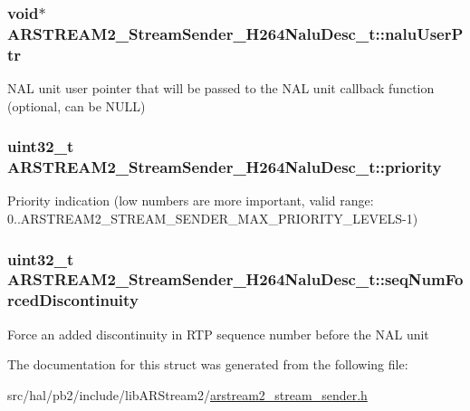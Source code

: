\subsubsection[{\texorpdfstring{nalu\+User\+Ptr}{naluUserPtr}}]{\setlength{\rightskip}{0pt plus 5cm}void$\ast$ A\+R\+S\+T\+R\+E\+A\+M2\+\_\+\+Stream\+Sender\+\_\+\+H264\+Nalu\+Desc\+\_\+t\+::nalu\+User\+Ptr}\hypertarget{struct_a_r_s_t_r_e_a_m2___stream_sender___h264_nalu_desc__t_add69d20cc84476ff31baeabfe43c672d}{}\label{struct_a_r_s_t_r_e_a_m2___stream_sender___h264_nalu_desc__t_add69d20cc84476ff31baeabfe43c672d}
N\+AL unit user pointer that will be passed to the N\+AL unit callback function (optional, can be N\+U\+LL) 
\subsubsection[{\texorpdfstring{priority}{priority}}]{\setlength{\rightskip}{0pt plus 5cm}uint32\+\_\+t A\+R\+S\+T\+R\+E\+A\+M2\+\_\+\+Stream\+Sender\+\_\+\+H264\+Nalu\+Desc\+\_\+t\+::priority}\hypertarget{struct_a_r_s_t_r_e_a_m2___stream_sender___h264_nalu_desc__t_a0a0e585271efa213f8c3641531edcd54}{}\label{struct_a_r_s_t_r_e_a_m2___stream_sender___h264_nalu_desc__t_a0a0e585271efa213f8c3641531edcd54}
Priority indication (low numbers are more important, valid range\+: 0..A\+R\+S\+T\+R\+E\+A\+M2\+\_\+\+S\+T\+R\+E\+A\+M\+\_\+\+S\+E\+N\+D\+E\+R\+\_\+\+M\+A\+X\+\_\+\+P\+R\+I\+O\+R\+I\+T\+Y\+\_\+\+L\+E\+V\+E\+L\+S-\/1) 
\subsubsection[{\texorpdfstring{seq\+Num\+Forced\+Discontinuity}{seqNumForcedDiscontinuity}}]{\setlength{\rightskip}{0pt plus 5cm}uint32\+\_\+t A\+R\+S\+T\+R\+E\+A\+M2\+\_\+\+Stream\+Sender\+\_\+\+H264\+Nalu\+Desc\+\_\+t\+::seq\+Num\+Forced\+Discontinuity}\hypertarget{struct_a_r_s_t_r_e_a_m2___stream_sender___h264_nalu_desc__t_a5eb58d803a57d57ac7a38b40f2cd590e}{}\label{struct_a_r_s_t_r_e_a_m2___stream_sender___h264_nalu_desc__t_a5eb58d803a57d57ac7a38b40f2cd590e}
Force an added discontinuity in R\+TP sequence number before the N\+AL unit 

The documentation for this struct was generated from the following file\+:\begin{DoxyCompactItemize}
\item 
src/hal/pb2/include/lib\+A\+R\+Stream2/\hyperlink{arstream2__stream__sender_8h}{arstream2\+\_\+stream\+\_\+sender.\+h}\end{DoxyCompactItemize}
